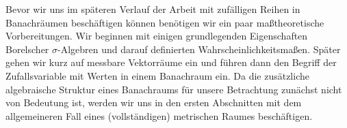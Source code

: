 Bevor wir uns im späteren Verlauf der Arbeit mit zufälligen Reihen in Banachräumen beschäftigen können benötigen wir ein paar maßtheoretische Vorbereitungen. 
Wir beginnen mit einigen grundlegenden Eigenschaften Borelscher $\sigma$-Algebren und darauf definierten Wahrscheinlichkeitsmaßen. 
Später gehen wir kurz auf messbare Vektorräume ein und führen dann den Begriff der Zufallsvariable mit Werten in einem Banachraum ein. 
Da die zusätzliche algebraische Struktur eines Banachraums für unsere Betrachtung zunächst nicht von Bedeutung ist, 
werden wir uns in den ersten Abschnitten mit dem allgemeineren Fall eines (vollständigen) metrischen Raumes beschäftigen.